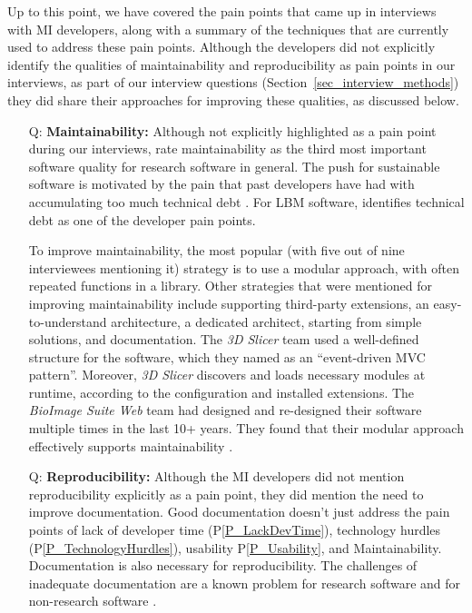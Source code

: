 \documentclass[final, 3p, times, authoryear]{elsarticle}
\newcommand{\ppref}[1]{P\ref{#1}}
\newcounter{qnum} %
\begin{document}
Up to this point, we have covered the pain points that came up in interviews
with MI developers, along with a summary of the techniques that are currently
used to address these pain points.  Although the developers did not explicitly
identify the qualities of maintainability and reproducibility as pain points in
our interviews, as part of our interview questions
(Section~\ref{sec_interview_methods}) they did share their approaches for
improving these qualities, as discussed below.

\begin{enumerate}
\item[Q\refstepcounter{qnum}\theqnum \label{Q_Maintainability}:]
\textbf{Maintainability:} Although not explicitly highlighted as a pain point
during our interviews, \citet{Nguyen-HoanEtAl2010} rate maintainability as the
third most important software quality for research software in general. The push
for sustainable software \citep{deSouzaEtAl2019} is motivated by the pain that
past developers have had with accumulating too much technical debt
\citep{KruchtenEtAl2012}.  For LBM software, \citet{SmithEtAl2022} identifies
technical debt as one of the developer pain points.

To improve maintainability, the most popular (with five out of nine interviewees
mentioning it) strategy is to use a modular approach, with often repeated
functions in a library.  Other strategies that were mentioned for improving
maintainability include supporting third-party extensions, an easy-to-understand
architecture, a dedicated architect, starting from simple solutions, and
documentation.  The \textit{3D Slicer} team used a well-defined structure for
the software, which they named as an ``event-driven MVC pattern''. Moreover,
\textit{3D Slicer} discovers and loads necessary modules at runtime, according
to the configuration and installed extensions. The \textit{BioImage Suite Web}
team had designed and re-designed their software multiple times in the last 10+
years. They found that their modular approach effectively supports
maintainability \citep{Joshi2011}. 

\item[Q\refstepcounter{qnum}\theqnum \label{Q_Reproducibility}:]
\textbf{Reproducibility:}  Although the MI developers did not mention
reproducibility explicitly as a pain point, they did mention the need to improve
documentation.  Good documentation doesn't just address the pain points of lack
of developer time (\ppref{P_LackDevTime}), technology hurdles
(\ppref{P_TechnologyHurdles}), usability \ppref{P_Usability}, and
Maintainability.  Documentation is also necessary for reproducibility. The
challenges of inadequate documentation are a known problem for research software
\citep{PintoEtAl2018, WieseEtAl2019} and for non-research software
\citep{LethbridgeEtAl2003}. 


\end{enumerate}
\end{document}
